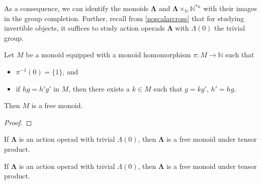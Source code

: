 \documentclass{amsbook} %
\newcommand{\ML}{\mathbf{\Lambda}}
\numberwithin{section}{chapter}
\begin{document}
As a consequence, we can identify the monoids $\ML$ and $\ML\times_{\mathbb{N}} \mathbb{N}^{\ast n}$ with their images in the group completion. Further, recall from \cref{noscalarcross} that for studying invertible objects, it suffices to study action operads $\ML$ with $\Lambda(0)$ the trivial group.

\begin{prop}\label{Gfree}
Let $M$ be a monoid equipped with a monoid homomorphism $\pi: M \to \mathbb{N}$ such that 
\begin{itemize}
\item $\pi^{-1}(0) = \{1\}$, and
\item if $hg = h' g'$ in $M$, then there exists a $k \in M$ such that $g = kg'$, $h' = hg$.
\end{itemize}
Then $M$ is a free monoid.
\end{prop}
\begin{proof}

\end{proof}
\begin{cor}
If $\ML$ is an action operad with trivial $\Lambda(0)$, then $\ML$ is a free monoid under tensor product.
\end{cor}
\begin{prop} %
If $\ML$ is an action operad with trivial $\Lambda(0)$, then $\ML$ is a free monoid under tensor product.
\end{prop}
\end{document}
